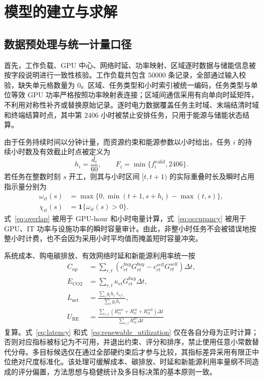 \section{模型的建立与求解}

\subsection{数据预处理与统一计量口径}

首先，工作负载、GPU 中心、网络时延、功率映射、区域逐时数据与储能信息被按字段说明进行一致性核验。工作负载共包含 $50000$ 条记录，全部通过输入校验，缺失单元格数量为 $0$。区域、任务类型和小时索引被统一编码，任务类型与单位等效 GPU 功率严格按照功率映射表连接；区域间通信采用有向单向时延矩阵，不利用对称性补齐或替换原始记录。逐时电力数据覆盖任务主时域、末端结清时域和终端结算时点，其中第 $2406$ 小时被禁止安排任务，只用于能源与储能状态结算。

由于任务持续时间以分钟计量，而资源约束和能源参数以小时给出，任务 $i$ 的持续小时数及有效截止时点被定义为
\begin{equation}
h_i=\frac{d_i}{60},\qquad
F_i=\min\{f_i^{\mathrm{valid}},2406\}.
\label{eq:duration_deadline}
\end{equation}
若任务在整数时刻 $s$ 开工，则其与小时区间 $[t,t+1)$ 的实际重叠时长及瞬时占用指示量分别为
\begin{align}
\omega_{it}(s)
&=\max\{0,\min(t+1,s+h_i)-\max(t,s)\}, \label{eq:overlap}\\
\chi_{it}(s)
&=\mathbf 1\{\omega_{it}(s)>0\}. \label{eq:occupancy}
\end{align}
式~\eqref{eq:overlap} 被用于 GPU-hour 和小时电量计算，式~\eqref{eq:occupancy} 被用于 GPU、IT 功率与设施功率的瞬时容量审计。由此，非整小时任务不会被错误地按整小时计费，也不会因为采用小时平均值而掩盖短时容量冲突。

系统成本、购电碳排放、有效网络时延和新能源利用率统一按
\begin{align}
C_{\mathrm{op}}
&=\sum_{r,t}\left(c_{rt}^{buy}G_{rt}^{buy}
-c_{rt}^{sell}G_{rt}^{sell}\right)\Delta t, \label{eq:cost}\\
E_{\mathrm{CO2}}
&=\sum_{r,t}\kappa_{rt}G_{rt}^{buy}\Delta t, \label{eq:carbon}\\
L_{\mathrm{net}}
&=\frac{\sum_i g_ih_i\ell_{o_ir_i}}{\sum_i g_ih_i}, \label{eq:latency}\\
U_{\mathrm{RE}}
&=\frac{\sum_{r,t}(R_{rt}^{use}+R_{rt}^{ch}+R_{rt}^{sell})\Delta t}
{\sum_{r,t}R_{rt}^{av}\Delta t} \label{eq:renewable_utilization}
\end{align}
复算。式~\eqref{eq:latency} 和式~\eqref{eq:renewable_utilization} 仅在各自分母为正时计算；否则对应指标被标记为不可用，并退出约束、评分和排序，禁止使用任意小常数替代分母。多目标候选仅在通过全部硬约束后才参与比较，其指标差异采用有限正中位绝对尺度标准化。该处理可缓解成本、碳排放、时延和新能源利用率量纲不同造成的评分偏置，方法思想与稳健统计及多目标决策的基本原则一致\cite{huber1964robust,miettinen1999nonlinear}。

